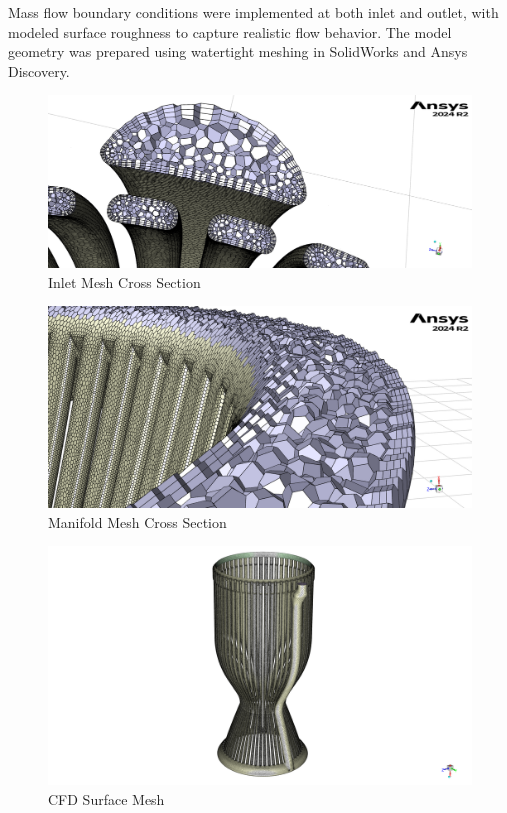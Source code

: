Mass flow boundary conditions were implemented at both inlet and outlet, with modeled surface roughness to capture realistic flow behavior. The model geometry was prepared using watertight meshing in SolidWorks and Ansys Discovery.
\begin{figure}
    \centering
    \includegraphics[width=1\linewidth]{Images/Inlet Mesh Cross Section.png}
    \caption{Inlet Mesh Cross Section}
    \label{fig:Inlet Mesh Cross Section}
\end{figure}
\begin{figure}
    \centering
    \includegraphics[width=1\linewidth]{Images/Manifold Mesh Cross Section.png}
    \caption{Manifold Mesh Cross Section}
    \label{fig:Manifold Mesh Cross Section}
\end{figure}
\begin{figure}
    \centering
    \includegraphics[width=1\linewidth]{Images/CFD Surface Mesh.png}
    \caption{CFD Surface Mesh}
    \label{fig:CFD Surface Mesh}
\end{figure}

